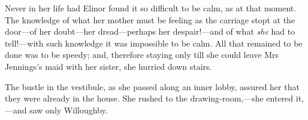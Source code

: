 Never in her life had Elinor found it so difficult to be calm, as at that moment. The knowledge of what her mother must be feeling as the carriage stopt at the door—of her doubt—her dread—perhaps her despair!—and of what \textit{she} had to tell!—with such knowledge it was impossible to be calm. All that remained to be done was to be speedy; and, therefore staying only till she could leave Mrs Jennings’s maid with her sister, she hurried down stairs.

The bustle in the vestibule, as she passed along an inner lobby, assured her that they were already in the house. She rushed to the drawing-room,—she entered it,—and saw only Willoughby.